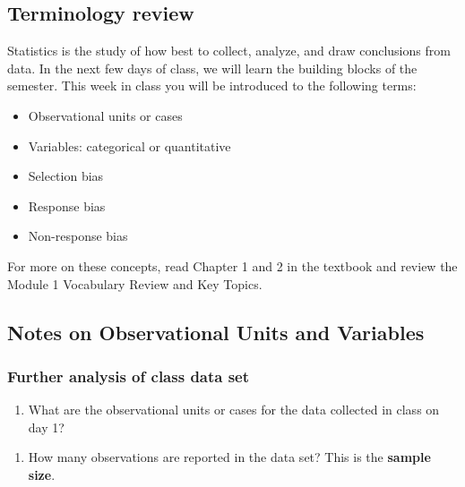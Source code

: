 \documentclass[
]{report}
\providecommand{\tightlist}{%
  \setlength{\itemsep}{0pt}\setlength{\parskip}{0pt}}
\begin{document}
\subsection{Terminology review}\label{terminology-review}

Statistics is the study of how best to collect, analyze, and draw conclusions from data. In the next few days of class, we will learn the building blocks of the semester. This week in class you will be introduced to the following terms:

\begin{itemize}
\item
  Observational units or cases
\item
  Variables: categorical or quantitative
\item
  Selection bias
\item
  Response bias
\item
  Non-response bias
\end{itemize}

For more on these concepts, read Chapter 1 and 2 in the textbook and review the Module 1 Vocabulary Review and Key Topics.

\subsection*{Notes on Observational Units and Variables}\label{notes-on-observational-units-and-variables}

\newpage

\subsubsection*{Further analysis of class data set}\label{further-analysis-of-class-data-set}

\begin{enumerate}
\def\labelenumi{\arabic{enumi}.}
\tightlist
\item
  What are the observational units or cases for the data collected in class on day 1?
\end{enumerate}

\vspace{0.3in}

\begin{enumerate}
\def\labelenumi{\arabic{enumi}.}
\setcounter{enumi}{1}
\tightlist
\item
  How many observations are reported in the data set? This is the \textbf{sample size}.
\end{enumerate}
\end{document}
